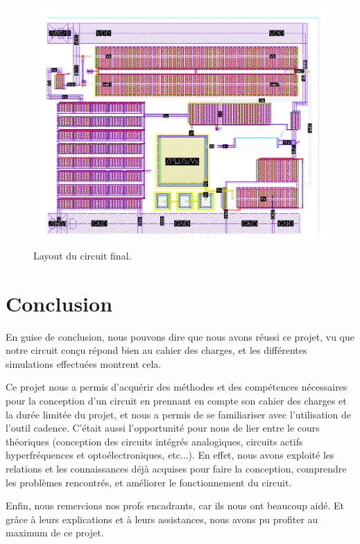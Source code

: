\documentclass[a4paper,12pt]{article}
\numberwithin{equation}{section}
\newcommand{\?}{\stackrel{?}{=}}
\begin{document}
\begin{figure}[htp!]
    \centering
    \includegraphics[width=\linewidth]{images/layout_fig.png}
    \caption{Layout du circuit final.}
    \label{fig:layout_fig}
\end{figure}

\FloatBarrier
\newpage
\section{Conclusion}

En guise de conclusion, nous pouvons dire que nous avons réussi ce projet, vu que notre circuit conçu répond bien au cahier des charges, et les différentes simulations effectuées montrent cela. 

Ce projet nous a permis d'acquérir des méthodes et des compétences nécessaires pour la conception d'un circuit en prennant en compte son cahier des charges et la durée limitée du projet, et nous a permis de se familiariser avec l'utilisation de l'outil cadence. C'était aussi l'opportunité pour nous de lier entre le cours théoriques (conception des circuits intégrés analogiques, circuits actifs hyperfréquences et optoélectroniques, etc...). En effet, nous avons exploité les relations et les connaissances déjà acquises pour faire la conception, comprendre les problèmes rencontrés, et améliorer le fonctionnement du circuit.

Enfin, nous remercions nos profs encadrants, car ils nous ont beaucoup aidé. Et grâce à leurs explications et à leurs assistances, nous avons pu profiter au maximum de ce projet.
\end{document}
